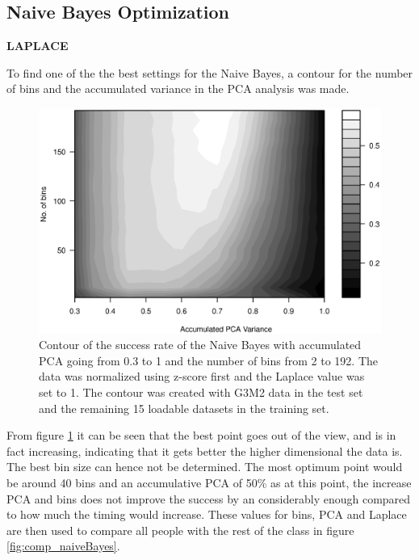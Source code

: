 \subsection{Naive Bayes Optimization}
\textbf{LAPLACE}

To find one of the the best settings for the Naive Bayes, a contour for the number of bins and the accumulated variance in the PCA analysis was made.

\begin{figure}[H]
\centering
\includegraphics[width = \textwidth]{graphics/contour_bins_vs_pca}
\caption{Contour of the success rate of the Naive Bayes with accumulated PCA going from 0.3 to 1 and the number of bins from 2 to 192.
The data was normalized using z-score first and the Laplace value was set to 1.
The contour was created with G3M2 data in the test set and the remaining 15 loadable datasets in the training set.}
\label{fig:contour_bin-vs-pca}
\end{figure}

From figure \ref{fig:contour_bin-vs-pca} it can be seen that the best point goes out of the view, and is in fact increasing, indicating that it gets better the higher dimensional the data is. The best bin size can hence not be determined. The most optimum point would be around 40 bins and an accumulative PCA of 50\% as at this point, the increase PCA and bins does not improve the success by an considerably enough compared to how much the timing would increase.
These values for bins, PCA and Laplace are then used to compare all people with the rest of the class in figure \ref{fig:comp_naiveBayes}.

